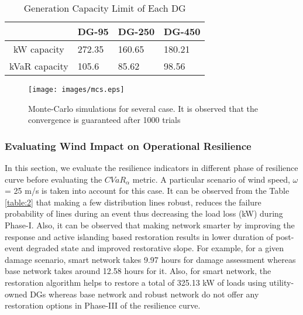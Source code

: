 \documentclass[12pt]{article}
\begin{document}
  
 
     \begin{table}[t]
     \vspace{-0.0 cm}
        \centering
        \caption{Generation Capacity Limit of Each DG}
        \vspace{-0.0 cm}
        \label{table:1}
        \begin{tabular}{cp{1.5cm}p{1.5cm}p{1.5cm}}
            \toprule[0.3 mm]
            & DG-95& DG-250&DG-450\\
            \hline
            kW capacity&272.35&160.65&180.21\\
            \hline
            kVaR capacity&105.6&85.62&98.56\\
            \toprule[0.3 mm]
        \end{tabular}
        \vspace{-0.2 cm}
    \end{table}

\begin{figure}[t]
    \centering
    \texttt{[image: images/mcs.eps]}
    \vspace{-0.5 cm}
    \caption{Monte-Carlo simulations for several case. It is observed that the convergence is guaranteed after 1000 trials}
    \label{fig:7}
    \vspace{-0.2 cm}
\end{figure} 

 

    
    
    
\subsubsection{Evaluating Wind Impact on Operational Resilience}
In this section, we evaluate the resilience indicators in different phase of resilience curve before evaluating the $CVaR_{\alpha}$ metric. A particular scenario of wind speed, $\omega$ = 25 m/s is taken into account for this case.
It can be observed from the Table \ref{table:2} that making a few distribution lines robust, reduces the failure probability of lines during an event thus decreasing the load loss (kW) during Phase-I. Also, it can be observed that making network smarter by improving the response and active islanding based restoration results in lower duration of post-event degraded state and improved restorative slope. For example, for a given damage scenario, smart network takes 9.97 hours for damage assessment whereas base network takes around 12.58 hours for it. Also, for smart network, the restoration algorithm helps to restore a total of 325.13 kW of loads using utility-owned DGs whereas base network and robust network do not offer any restoration options in Phase-III of the resilience curve.
\end{document}
